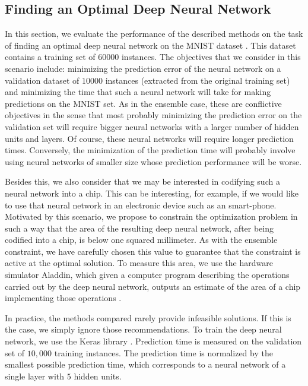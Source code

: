 \subsection{Finding an Optimal Deep Neural Network}

In this section, we evaluate the performance of the described methods on the task of finding an optimal
deep neural network on the MNIST dataset \citep{lecun2010mnist}. This dataset contains a training set
of $60000$ instances. The objectives that we consider in this scenario include: minimizing the prediction error
of the neural network on a validation dataset of $10000$ instances (extracted from the original training set)
and minimizing the time that such a neural network will take for making predictions on the MNIST set. As in the ensemble case, these
are conflictive objectives in the sense that most probably minimizing the prediction error on the validation
set will require bigger neural networks with a larger number of hidden units
and layers. Of course, these neural networks will require longer prediction times. Conversely, the minimization of
the prediction time will probably involve using neural networks of smaller size whose prediction performance will be worse.

Besides this, we also consider that we may be interested in codifying such a neural network into a chip. This can be
interesting, for example, if we would like to use that neural network in an electronic device such as an smart-phone.
Motivated by this scenario, we propose to constrain the optimization problem in such a way that the area of the
resulting deep neural network, after being codified into a chip, is below one squared millimeter.
As with the ensemble constraint, we have carefully chosen this value to guarantee that the constraint is active at the optimal solution.
To measure this area, we use the hardware simulator Aladdin, which given
a computer program describing the operations carried out by the deep neural network, outputs an estimate of the area of a chip implementing those
operations \citep{shao2014aladdin}.

In practice, the methods compared rarely provide infeasible solutions. If this is the case, we simply ignore those
recommendations. To train the deep neural network, we use the Keras library \citep{chollet2015keras}.
Prediction time is measured on the validation set of $10,000$ training instances.
The prediction time is normalized by the smallest possible prediction time, which corresponds to a neural network of a single layer with $5$ hidden units.

